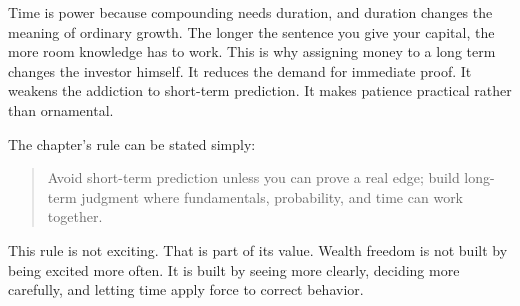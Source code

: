 Time is power because compounding needs duration, and duration changes the meaning of ordinary growth. The longer the sentence you give your capital, the more room knowledge has to work. This is why assigning money to a long term changes the investor himself. It reduces the demand for immediate proof. It weakens the addiction to short-term prediction. It makes patience practical rather than ornamental.

The chapter's rule can be stated simply:

\begin{quote}
Avoid short-term prediction unless you can prove a real edge; build long-term judgment where fundamentals, probability, and time can work together.
\end{quote}

This rule is not exciting. That is part of its value. Wealth freedom is not built by being excited more often. It is built by seeing more clearly, deciding more carefully, and letting time apply force to correct behavior.
